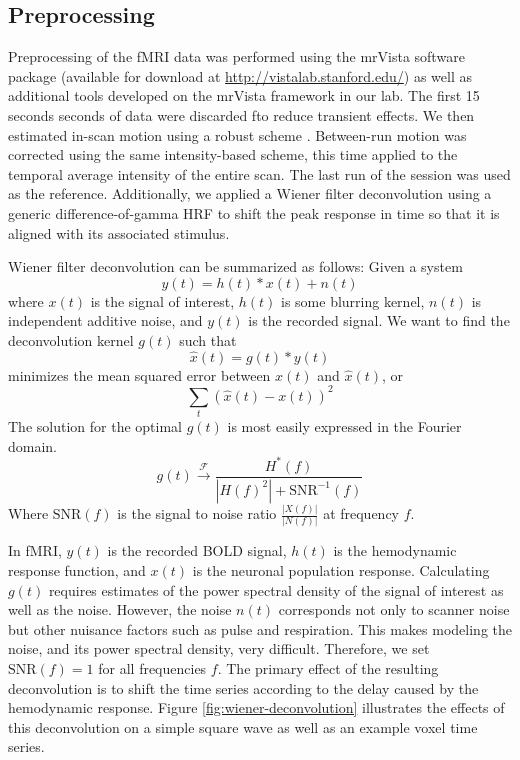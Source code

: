 \documentclass[final]{article}
\begin{document}
\subsection{Preprocessing}
Preprocessing of the fMRI data was performed using the mrVista software package (available for download at \url{http://vistalab.stanford.edu/}) as well as additional tools developed on the mrVista framework in our lab. 
The first 15 seconds seconds of data  were discarded fto reduce transient effects.
We then estimated in-scan motion using a robust scheme \cite{Nestares and Heeger 2000}. 
Between-run motion was corrected using the same intensity-based scheme, this time applied to the temporal average intensity of the entire scan. 
The last run of the session was used as the reference. 
Additionally, we applied a Wiener filter deconvolution \cite{Wiener} using a generic difference-of-gamma HRF \cite{Glover} to shift the peak response in time so that it is aligned with its associated stimulus.

Wiener filter deconvolution can be summarized as follows:
Given a system
\begin{equation}
y(t) = h(t) \ast x(t) + n(t)
\end{equation}
where $x(t)$ is the signal of interest, $h(t)$ is some blurring kernel, $n(t)$ is independent additive noise, and $y(t)$ is the recorded signal.
We want to find the deconvolution kernel $g(t)$ such that 
\begin{equation}
\hat{x}(t) = g(t) \ast y(t)
\end{equation}
minimizes the mean squared error between $x(t)$ and $\hat{x}(t)$, or
\begin{equation}
\sum_{t}{\left( \hat{x}(t) - x(t) \right)^{2}}
\end{equation}
The solution for the optimal $g(t)$ is most easily expressed in the Fourier domain.
\begin{equation}
g(t) \xrightarrow{\mathcal{F}} \frac{H^{*}(f)}{\left|H(f)^{2}\right| + \mbox{SNR}^{-1}(f)}
\end{equation}
Where $\mbox{SNR}(f)$ is the signal to noise ratio $\frac{\left| X(f) \right|}{\left| N(f) \right|}$ at frequency $f$.

In fMRI, $y(t)$ is the recorded BOLD signal, $h(t)$ is the hemodynamic response function, and $x(t)$ is the neuronal population response.
Calculating $g(t)$ requires estimates of the power spectral density of the signal of interest as well as the noise.
However, the noise $n(t)$ corresponds not only to scanner noise but other nuisance factors such as pulse and respiration.
This makes modeling the noise, and its power spectral density, very difficult.
Therefore, we set $\mbox{SNR}(f) = 1$ for all frequencies $f$.
The primary effect of the resulting deconvolution is to shift the time series according to the delay caused by the hemodynamic response.
Figure \ref{fig:wiener-deconvolution} illustrates the effects of this deconvolution on a simple square wave as well as an example voxel time series.
\end{document}
